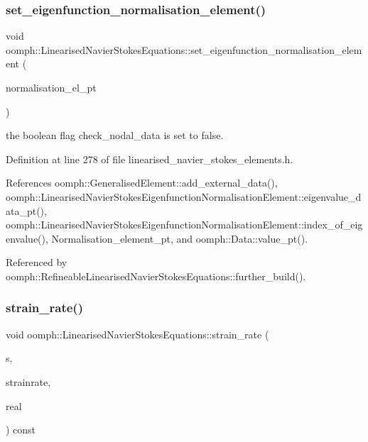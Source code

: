 \subsubsection{\texorpdfstring{set\+\_\+eigenfunction\+\_\+normalisation\+\_\+element()}{set\_eigenfunction\_normalisation\_element()}}
{\footnotesize\ttfamily void oomph\+::\+Linearised\+Navier\+Stokes\+Equations\+::set\+\_\+eigenfunction\+\_\+normalisation\+\_\+element (\begin{DoxyParamCaption}\item[{\hyperlink{classoomph_1_1LinearisedNavierStokesEigenfunctionNormalisationElement}{Linearised\+Navier\+Stokes\+Eigenfunction\+Normalisation\+Element} $\ast$const \&}]{normalisation\+\_\+el\+\_\+pt }\end{DoxyParamCaption})\hspace{0.3cm}{\ttfamily [inline]}}



the boolean flag check\+\_\+nodal\+\_\+data is set to false. 



Definition at line 278 of file linearised\+\_\+navier\+\_\+stokes\+\_\+elements.\+h.



References oomph\+::\+Generalised\+Element\+::add\+\_\+external\+\_\+data(), oomph\+::\+Linearised\+Navier\+Stokes\+Eigenfunction\+Normalisation\+Element\+::eigenvalue\+\_\+data\+\_\+pt(), oomph\+::\+Linearised\+Navier\+Stokes\+Eigenfunction\+Normalisation\+Element\+::index\+\_\+of\+\_\+eigenvalue(), Normalisation\+\_\+element\+\_\+pt, and oomph\+::\+Data\+::value\+\_\+pt().



Referenced by oomph\+::\+Refineable\+Linearised\+Navier\+Stokes\+Equations\+::further\+\_\+build().

\mbox{\label{classoomph_1_1LinearisedNavierStokesEquations_a4e88fcd2c85042a0dd98bba1bd37fcb0}} 
\subsubsection{\texorpdfstring{strain\+\_\+rate()}{strain\_rate()}}
{\footnotesize\ttfamily void oomph\+::\+Linearised\+Navier\+Stokes\+Equations\+::strain\+\_\+rate (\begin{DoxyParamCaption}\item[{const \hyperlink{classoomph_1_1Vector}{Vector}$<$ double $>$ \&}]{s,  }\item[{\hyperlink{classoomph_1_1DenseMatrix}{Dense\+Matrix}$<$ double $>$ \&}]{strainrate,  }\item[{const unsigned \&}]{real }\end{DoxyParamCaption}) const}



